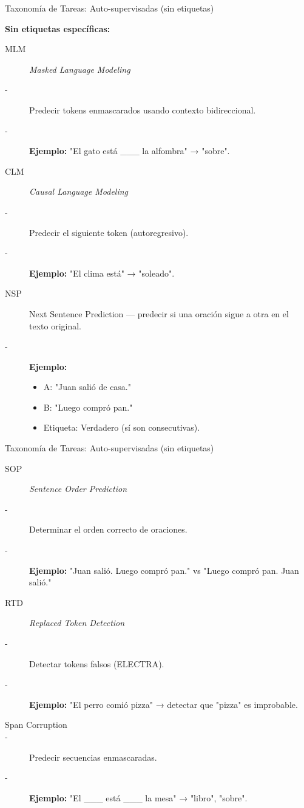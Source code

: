 \begin{frame}{Taxonomía de Tareas: Auto-supervisadas (sin etiquetas)}

\textbf{Sin etiquetas específicas:}

\begin{description}
    \item[MLM] \textit{Masked Language Modeling}
    \item[-] Predecir tokens enmascarados usando contexto bidireccional. 
    \item[-] \textbf{Ejemplo:} "El gato está \_\_\_ la alfombra" → "sobre".
    
    \item[CLM] \textit{Causal Language Modeling}
    \item[-]Predecir el siguiente token (autoregresivo).  
    \item[-]\textbf{Ejemplo:} "El clima está" → "soleado".
    
    \item[NSP] Next Sentence Prediction — predecir si una oración sigue a otra en el texto original.
    \item[-] \textbf{Ejemplo:} 
    \begin{itemize}
        \item A: "Juan salió de casa."
        \item B: "Luego compró pan."
        \item Etiqueta: Verdadero (sí son consecutivas).
    \end{itemize}
\end{description}

\end{frame}


\begin{frame}{Taxonomía de Tareas: Auto-supervisadas (sin etiquetas)}

\begin{description}

    \item[SOP] \textit{Sentence Order Prediction}
    \item[-] Determinar el orden correcto de oraciones.  
    \item[-] \textbf{Ejemplo:} "Juan salió. Luego compró pan." vs "Luego compró pan. Juan salió."
    
    \item[RTD] \textit{Replaced Token Detection}
    \item[-] Detectar tokens falsos (ELECTRA).  
    \item[-] \textbf{Ejemplo:} "El perro comió pizza" → detectar que "pizza" es improbable.
    
    \item[Span Corruption]  
    \item[-] Predecir secuencias enmascaradas.  
    \item[-] \textbf{Ejemplo:} "El \_\_\_ está \_\_\_ la mesa" → "libro", "sobre".
\end{description}

\end{frame}



